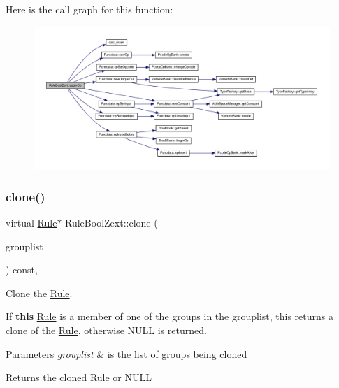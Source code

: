Here is the call graph for this function\+:
\nopagebreak
\begin{figure}[H]
\begin{center}
\leavevmode
\includegraphics[width=350pt]{class_rule_bool_zext_a167cc1b2d30a03f4efda236b63fa1838_cgraph}
\end{center}
\end{figure}
\mbox{\label{class_rule_bool_zext_a481738bbe3367de5a74cc535a6fe86d5}} 
\subsubsection{\texorpdfstring{clone()}{clone()}}
{\footnotesize\ttfamily virtual \mbox{\hyperlink{class_rule}{Rule}}$\ast$ Rule\+Bool\+Zext\+::clone (\begin{DoxyParamCaption}\item[{const \mbox{\hyperlink{class_action_group_list}{Action\+Group\+List}} \&}]{grouplist }\end{DoxyParamCaption}) const\hspace{0.3cm}{\ttfamily [inline]}, {\ttfamily [virtual]}}



Clone the \mbox{\hyperlink{class_rule}{Rule}}. 

If {\bfseries{this}} \mbox{\hyperlink{class_rule}{Rule}} is a member of one of the groups in the grouplist, this returns a clone of the \mbox{\hyperlink{class_rule}{Rule}}, otherwise N\+U\+LL is returned. 
\begin{DoxyParams}{Parameters}
{\em grouplist} & is the list of groups being cloned \\
\hline
\end{DoxyParams}
\begin{DoxyReturn}{Returns}
the cloned \mbox{\hyperlink{class_rule}{Rule}} or N\+U\+LL 
\end{DoxyReturn}


